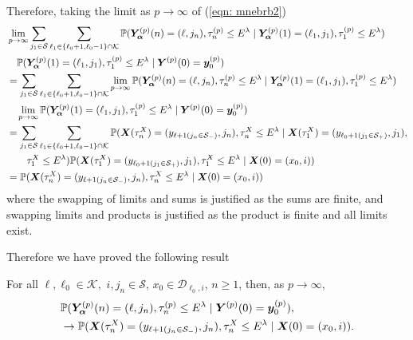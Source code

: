 Therefore, taking the limit as \(p\to \infty \) of (\ref{eqn: mnebrb2}) 
\begin{align}
	&\lim_{p\to\infty}\sum_{j_1\in\mathcal S}\sum_{\ell_1\in\{\ell_0+1,\ell_0-1\}\cap \mathcal K}\mathbb P(\bm{Y}_{\bm{\alpha}}^{(p)}(n) = (\ell, j_n), \tau_{n}^{(p)}\leq E^\lambda 
	 \mid \bm{Y}_{\bm{\alpha}}^{(p)}(1)=(\ell_1,j_1), \tau_{1}^{(p)}\leq E^{\lambda}) \nonumber 
	 \\& \quad\mathbb P(\bm{Y}_{\bm{\alpha}}^{(p)}(1)=(\ell_1, j_1), \tau_{1}^{(p)}\leq E^\lambda
	 \mid \boldsymbol Y^{(p)}(0)=\boldsymbol y_0^{(p)}) \nonumber
	 \\&= \sum_{j_1\in\mathcal S}\sum_{\ell_1\in\{\ell_0+1,\ell_0-1\}\cap \mathcal K} \lim_{p\to\infty} \mathbb P(\bm{Y}_{\bm{\alpha}}^{(p)}(n) = (\ell, j_n), \tau_{n}^{(p)}\leq E^\lambda 
	 \mid \bm{Y}_{\bm{\alpha}}^{(p)}(1)=(\ell_1, j_1), \tau_1^{(p)}\leq E^\lambda) \nonumber
	 \\& \quad\lim_{p\to\infty}\mathbb P(\bm{Y}_{\bm{\alpha}}^{(p)}(1)=(\ell_1, j_1), \tau_{1}^{(p)}\leq E^\lambda
	 \mid \boldsymbol Y^{(p)}(0)=\boldsymbol y_0^{(p)})\nonumber
	 \\&= \sum_{j_1\in\mathcal S}\sum_{\ell_1\in\{\ell_0+1,\ell_0-1\}\cap \mathcal K} \mathbb P(\boldsymbol X(\tau_n^X) = (y_{\ell+1(j_{n}\in\mathcal S_-)}, 
		j_n), \tau_{n}^X\leq E^\lambda \mid \nonumber
		\boldsymbol X(\tau_1^X)=(y_{\ell_{0}+1(j_{1}\in\mathcal S_+)},
		j_{1}),
		\\&\qquad{}\tau_1^X\leq E^\lambda) \nonumber
	 \mathbb P(\boldsymbol X(\tau_1^X)=(y_{\ell_{0}+1(j_{1}\in\mathcal S_+)},
		j_{1}),\tau_1^X\leq E^\lambda
		\mid \boldsymbol X(0)=(x_0, i)) \nonumber
	\\&=\mathbb P(\boldsymbol X(\tau_n^X) = (y_{\ell+1(j_{n}\in\mathcal S_-)}, 
		j_n), \tau_{n}^X\leq E^\lambda
		\mid \boldsymbol X(0)=(x_0, i))
	 \label{eqn: mnebrb22}
\end{align}
where the swapping of limits and sums is justified as the sums are finite, and swapping limits and products is justified as the product is finite and all limits exist. 

Therefore we have proved the following result 
\begin{lem}\label{lem: kKKJJJF}
	For all \(\ell,\ell_0\in\mathcal K,\) \(i,j_n\in\mathcal S\), \(x_0\in\mathcal D_{\ell_0,i}\), \(n\geq 1\), then, as \(p\to\infty\),
	\begin{align}
		&\mathbb P(\bm{Y}_{\bm{\alpha}}^{(p)}(n) = (\ell,j_n), \tau_{n}^{(p)}\leq E^{\lambda}
		 \mid \boldsymbol Y^{(p)}(0)=\boldsymbol y_0^{(p)}),\nonumber 
		 \\&\to \mathbb P(\boldsymbol X(\tau_n^X) = (y_{\ell+1(j_{n}\in\mathcal S_-)}, 
		j_n), \tau_{n}^X\leq E^\lambda
		\mid \boldsymbol X(0)=(x_0, i)).
	\end{align}
\end{lem} 


